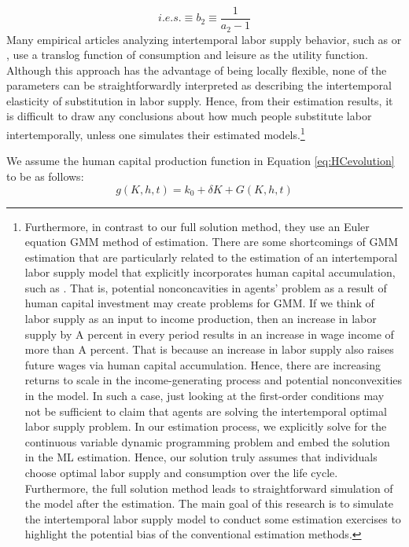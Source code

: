 \documentclass[\econtexRoot/ImaiKeane]{subfiles}
\begin{document}
\begin{equation*}
  i.e.s. \equiv b_2 \equiv \dfrac{1}{a_2-1}
\end{equation*}
Many empirical articles analyzing intertemporal labor supply behavior, such as \cite{Shaw1989-jb} or \cite{Hotz1988-gl}, use a translog function of consumption and leisure as the utility function. Although this approach has the advantage of being locally flexible, none of the parameters can be straightforwardly interpreted as describing the intertemporal elasticity of substitution in labor supply. Hence, from their estimation results, it is difficult to draw any conclusions about how much people substitute labor intertemporally, unless one simulates their estimated models.\footnote[6]{ Furthermore, in contrast to our full solution method, they use an Euler equation GMM method of estimation. There are some shortcomings of GMM estimation that are particularly related to the estimation of an intertemporal labor supply model that explicitly incorporates human capital accumulation, such as \cite{Shaw1989-jb}. That is, potential nonconcavities in agents' problem as a result of human capital investment may create problems for GMM. If we think of labor supply as an input to income production, then an increase in labor supply by A percent in every period results in an increase in wage income of more than A percent. That is because an increase in labor supply also raises future wages via human capital accumulation. Hence, there are increasing returns to scale in the income-generating process and potential nonconvexities in the model. In such a case, just looking at the first-order conditions may not be sufficient to claim that agents are solving the intertemporal optimal labor supply problem. In our estimation process, we explicitly solve for the continuous variable dynamic programming problem and embed the solution in the ML estimation. Hence, our solution truly assumes that individuals choose optimal labor supply and consumption over the life cycle. Furthermore, the full solution method leads to straightforward simulation of the model after the estimation. The main goal of this research is to simulate the intertemporal labor supply model to conduct some estimation exercises to highlight the potential bias of the conventional estimation methods.} \par
We assume the human capital production function in Equation \eqref{eq:HCevolution} to be as follows:
\begin{equation} \tag{4a}
g(K,h,t) = k_0 + \delta K + G(K,h,t)
  \end{equation}
\end{document}
